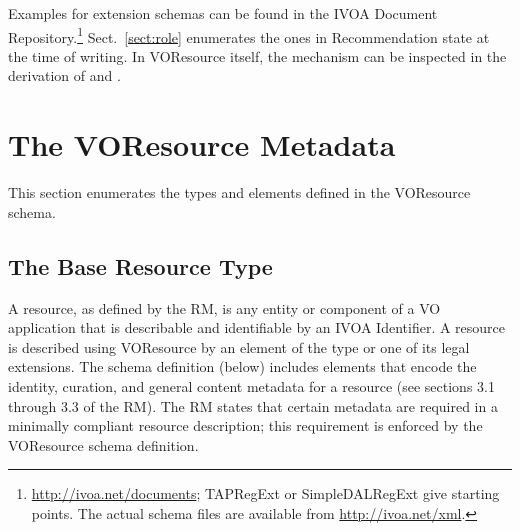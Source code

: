 \documentclass[11pt,a4paper]{ivoa}
\begin{document}
Examples for extension schemas can be found in the IVOA Document
Repository.\footnote{\url{http://ivoa.net/documents}; TAPRegExt or
SimpleDALRegExt give starting points.  The actual schema files are
available from \url{http://ivoa.net/xml}.}
Sect.~\ref{sect:role} enumerates the ones in Recommendation state at the
time of writing.  In VOResource itself, the mechanism can be inspected
in the derivation of  and .


\section{The VOResource Metadata}
\label{sect:metadata}


This section enumerates the types and elements defined in the
VOResource schema.


\subsection{The Base Resource Type}

\label{sect:restype}

A resource, as defined by the RM, is any entity or component of a VO
application that is describable and identifiable by an IVOA Identifier.
A resource is described using VOResource by an element of the type
 or one of its legal extensions.  The schema
definition (below) includes elements that encode the identity, curation,
and general content metadata for a resource (see sections 3.1 through
3.3 of the RM).  The RM states that certain metadata are required in a
minimally compliant resource description; this requirement is enforced
by the VOResource schema definition.

\goodbreak
\end{document}

